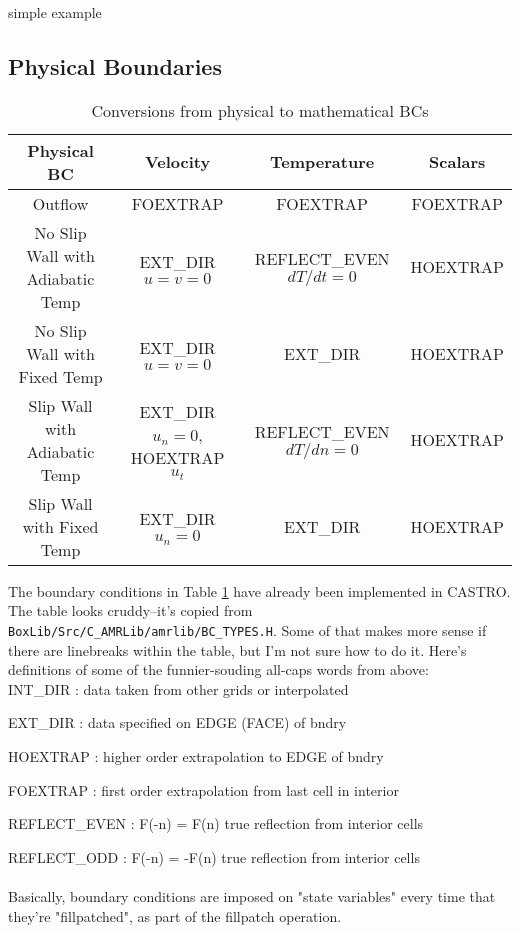 {\color{red}simple example}


\subsection{Physical Boundaries}
\begin{table}[h]
\begin{scriptsize}
\begin{center}
\begin{tabular}{|c|c|c|c|} \hline
Physical BC & Velocity & Temperature & Scalars \\
\hline
Outflow & FOEXTRAP & FOEXTRAP & FOEXTRAP \\
No Slip Wall with Adiabatic Temp & EXT\_DIR $u=v=0$ & REFLECT\_EVEN $dT/dt=0$ & HOEXTRAP \\
No Slip Wall with Fixed Temp & EXT\_DIR $u=v=0$ & EXT\_DIR & HOEXTRAP \\
Slip Wall with Adiabatic Temp & EXT\_DIR $u_n=0$, HOEXTRAP $u_t$ & REFLECT\_EVEN $dT/dn=0$ & HOEXTRAP \\
Slip Wall with Fixed Temp & EXT\_DIR $u_n=0$ & EXT\_DIR & HOEXTRAP \\
\hline
\end{tabular}
\end{center}
\caption{Conversions from physical to mathematical BCs}
\label{Table:BC}
\end{scriptsize}
\end{table}
The boundary conditions in Table \ref{Table:BC} have already been implemented in CASTRO.  
The table looks cruddy--it's copied from {\tt BoxLib/Src/C\_AMRLib/amrlib/BC\_TYPES.H}. 
Some of that makes more sense if there are linebreaks within the table, 
but I'm not sure how to do it. Here's definitions of some of the funnier-souding all-caps words from above:\\

INT\_DIR  : data taken from other grids or interpolated

EXT\_DIR  : data specified on EDGE (FACE) of bndry

HOEXTRAP  : higher order extrapolation to EDGE of bndry

FOEXTRAP  : first order extrapolation from last cell in interior

REFLECT\_EVEN : F(-n) = F(n) true reflection from interior cells

REFLECT\_ODD  : F(-n) = -F(n) true reflection from interior cells\\ \\
Basically, boundary conditions are imposed on "state variables" every time that they're "fillpatched", as part of the fillpatch operation.

